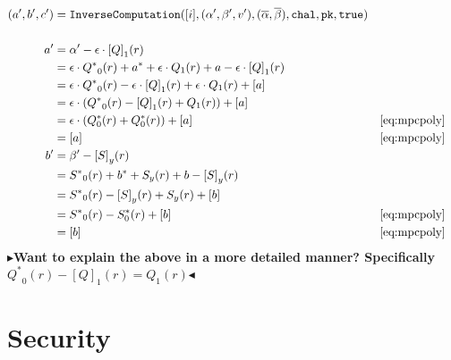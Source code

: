 \documentclass[twoside,11pt]{report}
\theoremstyle{definition}
\theoremstyle{plain}
\newcommand{\todo}[1]{{\color[rgb]{.5,0,0}\textbf{$\blacktriangleright$#1$\blacktriangleleft$}}}
\begin{document}
\begin{align*}
  (a', b', c') & = \texttt{InverseComputation}([i], (\alpha', \beta', v'),
  (\overline{\alpha}, \overline{\beta}), \texttt{chal}, \texttt{pk}, \texttt{true})                                                  \\\\
  a'           & = \alpha' - \epsilon \cdot {[Q]}_1(r)                                                                               \\
               & = \epsilon \cdot {Q^*}_0(r) + a^* + \epsilon \cdot Q_1(r) + a - \epsilon \cdot {[Q]}_1(r)                           \\
               & = \epsilon \cdot {Q^*}_0(r) - \epsilon \cdot {[Q]}_1(r) + \epsilon \cdot Q_1(r) + [a]                               \\
               & = \epsilon \cdot ({Q^*}_0(r) - {[Q]}_1(r) +  Q_1(r)) + [a]                                                          \\
               & = \epsilon \cdot (Q^*_0(r) +  Q^*_0(r)) + [a]                                             &  & \autoref{eq:mpcpoly} \\
               & = [a]                                                                                     &  & \autoref{eq:mpcpoly} \\
  b'           & = \beta' - {[S]}_y(r)                                                                                               \\
               & = {S^*}_0(r) + b^* + S_y(r) + b - {[S]}_y(r)                                                                        \\
               & = {S^*}_0(r) - {[S]}_y(r) + S_y(r)  + [b]                                                                           \\
               & = {S^*}_0(r) - S^*_0(r)  + [b]                                                            &  & \autoref{eq:mpcpoly} \\
               & = [b]                                                                                     &  & \autoref{eq:mpcpoly} \\
\end{align*}
\todo{Want to explain the above in a more detailed manner? Specifically ${Q^*}_0(r) - {[Q]}_1(r) = Q_1(r)$}

\section{Security}
\end{document}
